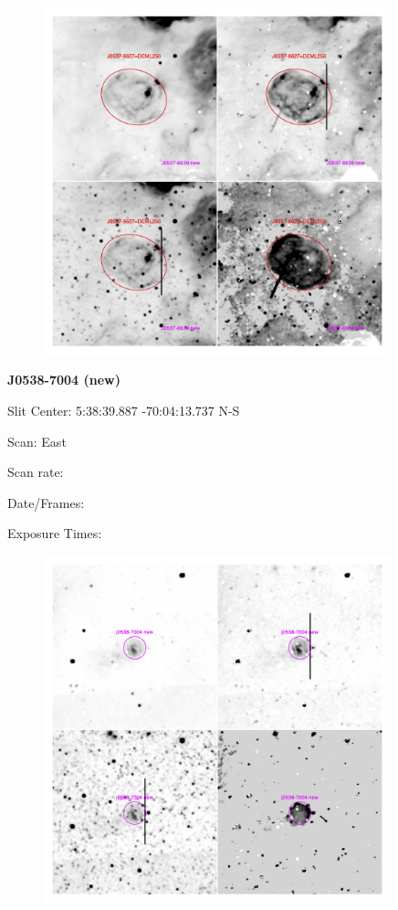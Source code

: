 \documentclass[11pt]{article}
\begin{document}
\begin{figure}
\includegraphics[width=10.05cm]{snapshots/J0537-6627.png}
\end{figure}

\newpage
{\bf J0538-7004 (new)}  
 
Slit Center:  5:38:39.887  -70:04:13.737 N-S

Scan:  East

Scan rate:  

Date/Frames:

Exposure Times:  

\begin{figure}
\includegraphics[width=10.05cm]{snapshots/J0538-7004.png}
\end{figure}
\end{document}
